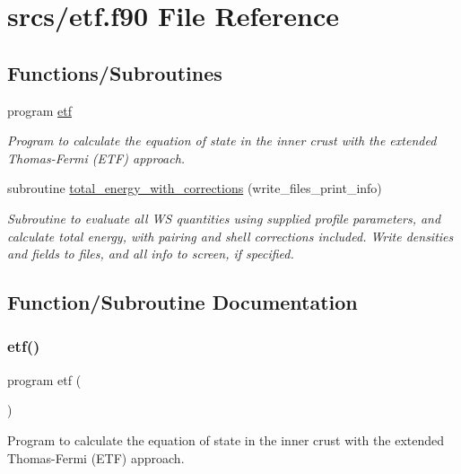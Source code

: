 \hypertarget{etf_8f90}{}\section{srcs/etf.f90 File Reference}
\label{etf_8f90}
\subsection*{Functions/\+Subroutines}
\begin{DoxyCompactItemize}
\item 
program \mbox{\hyperlink{etf_8f90_a77a926a33d4e2b4d7c47fa641fc32e57}{etf}}
\begin{DoxyCompactList}\small\item\em Program to calculate the equation of state in the inner crust with the extended Thomas-\/\+Fermi (E\+TF) approach. \end{DoxyCompactList}\item 
subroutine \mbox{\hyperlink{etf_8f90_a48fed0623ded12967501f647461fb1cb}{total\+\_\+energy\+\_\+with\+\_\+corrections}} (write\+\_\+files\+\_\+print\+\_\+info)
\begin{DoxyCompactList}\small\item\em Subroutine to evaluate all WS quantities using supplied profile parameters, and calculate total energy, with pairing and shell corrections included. Write densities and fields to files, and all info to screen, if specified. \end{DoxyCompactList}\end{DoxyCompactItemize}


\subsection{Function/\+Subroutine Documentation}
\mbox{\label{etf_8f90_a77a926a33d4e2b4d7c47fa641fc32e57}} 
\subsubsection{\texorpdfstring{etf()}{etf()}}
{\footnotesize\ttfamily program etf (\begin{DoxyParamCaption}{ }\end{DoxyParamCaption})}



Program to calculate the equation of state in the inner crust with the extended Thomas-\/\+Fermi (E\+TF) approach. 

